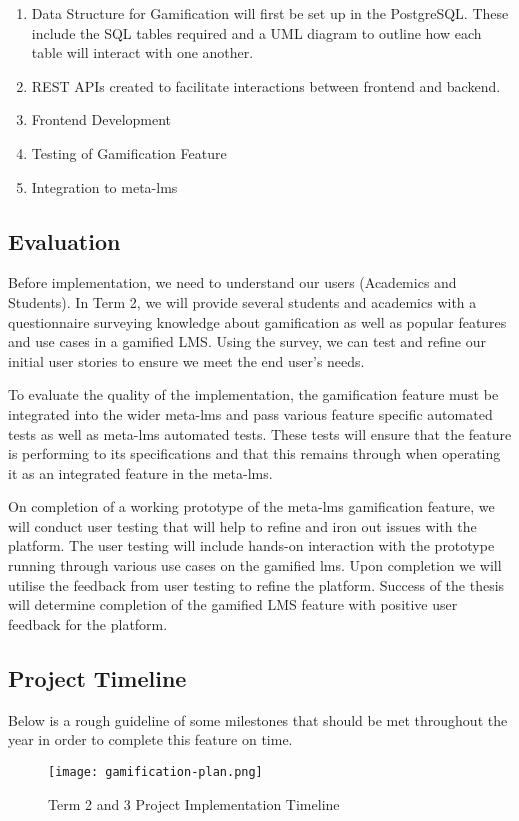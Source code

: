 \begin{enumerate}
    \item Data Structure for Gamification will first be set up in the PostgreSQL. These include the SQL tables required and a UML diagram to outline how each table will interact with one another.
    \item REST APIs created to facilitate interactions between frontend and backend.
    \item Frontend Development
    \item Testing of Gamification Feature
    \item Integration to meta-lms
\end{enumerate}

\subsection{Evaluation}
Before implementation, we need to understand our users (Academics and Students). In Term 2, we will provide several students and academics with a questionnaire surveying knowledge about gamification as well as popular features and use cases in a gamified LMS. Using the survey, we can test and refine our initial user stories to ensure we meet the end user’s needs.

To evaluate the quality of the implementation, the gamification feature must be integrated into the wider meta-lms and pass various feature specific automated tests as well as meta-lms automated tests. These tests will ensure that the feature is performing to its specifications and that this remains through when operating it as an integrated feature in the meta-lms.

On completion of a working prototype of the meta-lms gamification feature, we will conduct user testing that will help to refine and iron out issues with the platform. The user testing will include hands-on interaction with the prototype running through various use cases on the gamified lms. Upon completion we will utilise the feedback from user testing to refine the platform. Success of the thesis will determine completion of the gamified LMS feature with positive user feedback for the platform.


\subsection{Project Timeline}
Below is a rough guideline of some milestones that should be met throughout the year in order to complete this feature on time.

\begin{figure}[h!]
    \texttt{[image: gamification-plan.png]}
    \centering
    \caption{Term 2 and 3 Project Implementation Timeline}
\end{figure}

\newpage